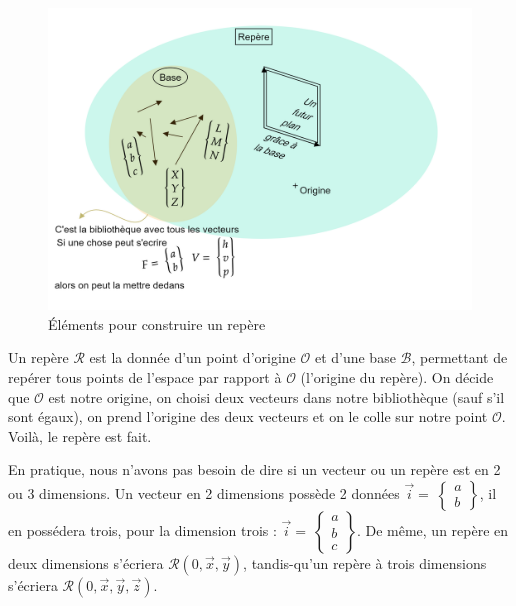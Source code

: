 \documentclass[
	11pt, %
	fleqn, %
	a4paper, %
]{LegrandOrangeBook}
\begin{document}
\begin{figure}[H] %
	\centering %
	\includegraphics[width=1.1\textwidth]{Images/vect1.png} %
	\caption{Éléments pour construire un repère}
	\label{vect1} %
\end{figure}


Un repère $\mathcal{R}$ est la donnée d’un point d'origine $\mathcal{O}$ et d’une base $\mathcal{B}$, permettant de repérer tous points de
l’espace par rapport à $\mathcal{O}$ (l'origine du repère). On décide que $\mathcal{O}$ est notre origine, on choisi deux vecteurs dans notre bibliothèque (sauf s'il sont égaux), on prend l'origine des deux vecteurs et on le colle sur notre point $\mathcal{O}$. Voilà, le repère est fait. \\

\begin{remark}
    En pratique, nous n'avons pas besoin de dire si un vecteur ou un repère est en 2 ou 3 dimensions. Un vecteur en 2 dimensions possède 2 données $\Vec{i}=\ \begin{Bmatrix} a\\ b \end{Bmatrix} $, il en possédera trois, pour la dimension trois : $\Vec{i}=\ \begin{Bmatrix} a\\ b \\ c \end{Bmatrix} $. De même, un repère en deux dimensions s'écriera $\mathcal{R}(0, \Vec{x}, \Vec{y})$, tandis-qu'un repère à trois dimensions s'écriera $\mathcal{R}(0, \Vec{x}, \Vec{y}, \Vec{z})$.    
\end{remark}
\end{document}
